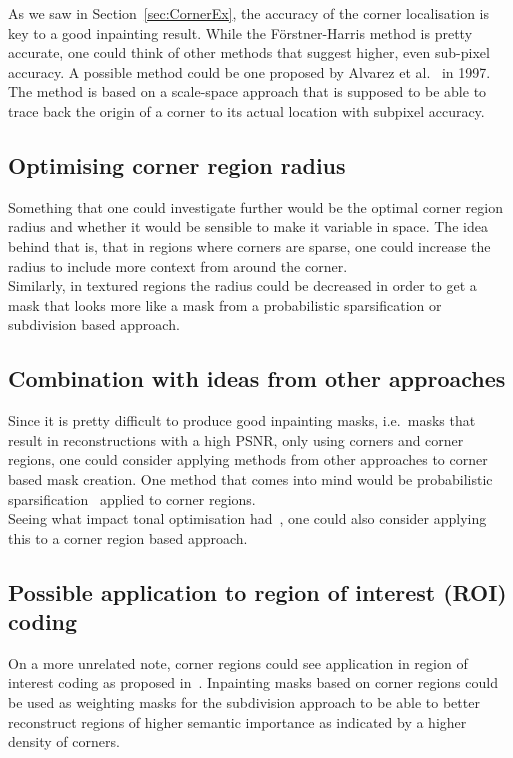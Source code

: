 As we saw in Section~\ref{sec:CornerEx}, the accuracy of the corner localisation is key to a good
inpainting result. While the Förstner-Harris method is pretty accurate, one could think of other
methods that suggest higher, even sub-pixel accuracy. A possible method could be one proposed by
Alvarez et al.~\cite{amss} in 1997. The method is based on a scale-space approach that is supposed
to be able to trace back the origin of a corner to its actual location with subpixel accuracy.

\subsection*{Optimising corner region radius}

Something that one could investigate further would be the optimal corner region radius and whether
it would be sensible to make it variable in space. The idea behind that is, that in regions where
corners are sparse, one could increase the radius to include more context from around the corner.\\
Similarly, in textured regions the radius could be decreased in order to get a mask that looks more
like a mask from a probabilistic sparsification or subdivision based approach.

\subsection*{Combination with ideas from other approaches}

Since it is pretty difficult to produce good inpainting masks, i.e.\ masks that result in
reconstructions with a high PSNR, only using corners and corner regions, one could consider
applying methods from other approaches to corner based mask creation. One method that comes into
mind would be probabilistic sparsification~\cite{hoeltgen12, schmaltz14} applied to corner regions.\\
Seeing what impact tonal optimisation had~\cite{hoeltgen12, schmaltz14}, one could also consider
applying this to a corner region based approach.

\subsection*{Possible application to region of interest (ROI) coding}

On a more unrelated note, corner regions could see application in region of interest coding as
proposed in~\cite{peter15}. Inpainting masks based on corner regions could be used as weighting
masks for the subdivision approach to be able to better reconstruct regions of higher semantic
importance as indicated by a higher density of corners.
